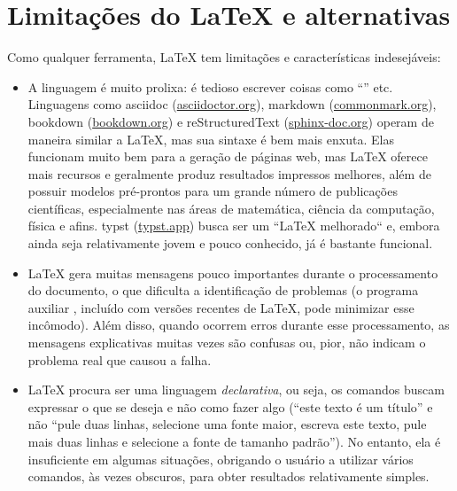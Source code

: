 \section{Limitações do \LaTeX{} e alternativas}
\label{sec:limitations}

Como qualquer ferramenta, \LaTeX{} tem limitações e características
indesejáveis:

\begin{itemize}
    \item A linguagem é muito prolixa: é tedioso escrever coisas como
    ``'' etc. Linguagens como
    asciidoc (\url{asciidoctor.org}), markdown (\url{commonmark.org}),
    bookdown (\url{bookdown.org}) e reStructuredText (\url{sphinx-doc.org})
    operam de maneira similar a \LaTeX{}, mas sua sintaxe é bem mais
    enxuta. Elas funcionam muito bem para a geração de páginas web,
    mas \LaTeX{} oferece mais recursos e geralmente produz resultados
    impressos melhores, além de possuir modelos pré-prontos para um
    grande número de publicações científicas, especialmente nas áreas
    de matemática, ciência da computação, física e afins. typst
    (\url{typst.app}) busca ser um ``\LaTeX{} melhorado`` e, embora
    ainda seja relativamente jovem e pouco conhecido, já é bastante
    funcional.

    \item \LaTeX{} gera muitas mensagens pouco importantes durante
    o processamento do documento, o que dificulta a identificação
    de problemas (o programa auxiliar , incluído
    com versões recentes de \LaTeX{}, pode minimizar esse incômodo).
    Além disso, quando ocorrem erros durante esse processamento, as
    mensagens explicativas muitas vezes são confusas ou, pior, não
    indicam o problema real que causou a falha.

    \item \LaTeX{} procura ser uma linguagem \emph{declarativa}, ou seja,
    os comandos buscam expressar o que se deseja e não como fazer algo
    (``este texto é um título'' e não ``pule duas linhas, selecione uma
    fonte maior, escreva este texto, pule mais duas linhas e selecione a
    fonte de tamanho padrão''). No entanto, ela é insuficiente em algumas
    situações, obrigando o usuário a utilizar vários comandos, às vezes
    obscuros, para obter resultados relativamente simples.


\end{itemize}
